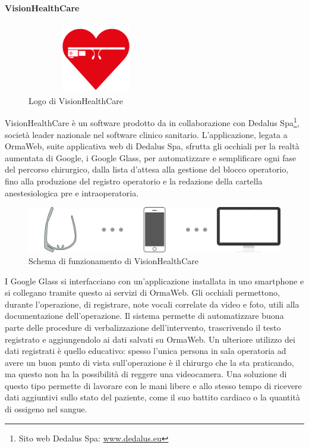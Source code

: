    \paragraph{VisionHealthCare}
   \begin{figure}[H]
      \begin{center}
         \includegraphics[width=6cm,height=3cm,keepaspectratio]{immagini/visionhealthcare-logo}
      \end{center}
      \caption{Logo di VisionHealthCare}\label{logovisionhealthcare}
   \end{figure}
   VisionHealthCare è un software prodotto da \nomeAzienda{} in collaborazione con Dedalus Spa\footnote{Sito web Dedalus Spa: \href{www.dedalus.eu}{www.dedalus.eu}}, società leader nazionale nel software clinico sanitario. L'applicazione, legata a OrmaWeb, suite applicativa web di Dedalus Spa, sfrutta gli occhiali per la realtà aumentata di Google, i Google Glass, per automatizzare e semplificare ogni fase del percorso chirurgico, dalla lista d'attesa alla gestione del blocco operatorio, fino alla produzione del registro operatorio e la redazione della cartella anestesiologica pre e intraoperatoria.
   \begin{figure}[H]
      \begin{center}
         \includegraphics[width=15cm,keepaspectratio]{immagini/visionhealthcare-schema}
      \end{center}
      \caption{Schema di funzionamento di VisionHealthCare}\label{schemavisionhealthcare}
   \end{figure}
   I Google Glass si interfacciano con un'applicazione installata in uno smartphone e si collegano tramite questo ai servizi di OrmaWeb.
   Gli occhiali permettono, durante l'operazione, di registrare, note vocali correlate da video e foto, utili alla documentazione dell'operazione. Il sistema permette di automatizzare buona parte delle procedure di verbalizzazione dell'intervento, trascrivendo il testo registrato e aggiungendolo ai dati salvati su OrmaWeb. Un ulteriore utilizzo dei dati registrati è quello educativo: spesso l'unica persona in sala operatoria ad avere un buon punto di vista sull'operazione è il chirurgo che la sta praticando, ma questo non ha la possibilità di reggere una videocamera. Una soluzione di questo tipo permette di lavorare con le mani libere e allo stesso tempo di ricevere dati aggiuntivi sullo stato del paziente, come il suo battito cardiaco o la quantità di ossigeno nel sangue.


